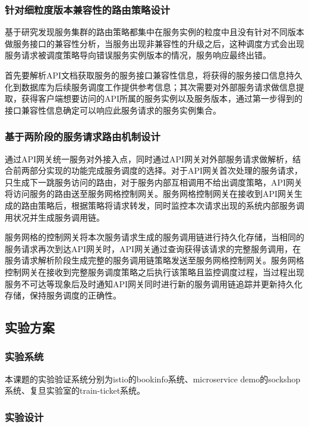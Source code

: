 \subsubsection{针对细粒度版本兼容性的路由策略设计}

基于研究发现服务集群的路由策略都集中在服务实例的粒度中且没有针对不同版本做服务接口的兼容性分析，当服务出现非兼容性的升级之后，这种调度方式会出现服务请求被调度策略导向错误服务实例版本的情况，服务响应最终出错。\par
首先要解析API文档获取服务的服务接口兼容性信息，将获得的服务接口信息持久化到数据库为后续服务调度工作提供参考信息；其次需要对外部服务请求做信息提取，获得客户端想要访问的API所属的服务实例以及服务版本，通过第一步得到的接口兼容性信息确定可以响应此服务请求的服务实例集合。\par

\subsubsection{基于两阶段的服务请求路由机制设计}

通过API网关统一服务对外接入点，同时通过API网关对外部服务请求做解析，结合前两部分实现的功能完成服务调度的选择。对于API网关首次处理的服务请求，只生成下一跳服务访问的路由，对于服务内部互相调用不给出调度策略，API网关将访问服务的路由送至服务网格控制网关。服务网格控制网关在接收到API网关生成的路由策略后，根据策略将请求转发，同时监控本次请求出现的系统内部服务调用状况并生成服务调用链。\par
服务网格的控制网关将本次服务请求生成的服务调用链进行持久化存储，当相同的服务请求再次到达API网关时，API网关通过查询获得该请求的完整服务调用，在服务请求解析阶段生成完整的服务调用链策略发送至服务网格控制网关。服务网格控制网关在接收到完整服务调度策略之后执行该策略且监控调度过程，当过程出现服务不可达等现象后及时通知API网关同时进行新的服务调用链追踪并更新持久化存储，保持服务调度的正确性。

\subsection{实验方案}

\subsubsection{实验系统}

本课题的实验验证系统分别为istio的bookinfo系统、microservice demo的sockshop系统、复旦实验室的train-ticket系统。

\subsubsection{实验设计}

